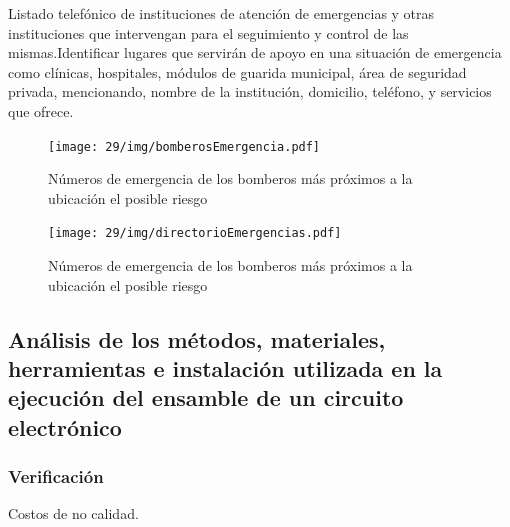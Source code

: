     Listado telefónico de instituciones de atención de emergencias y otras instituciones que intervengan para el seguimiento y control de las mismas.Identificar  lugares que servirán de apoyo en una situación de emergencia como clínicas, hospitales, módulos de guarida municipal, área de seguridad privada, mencionando, nombre de la institución, domicilio, teléfono, y servicios que ofrece. 
    
    \begin{figure}[H]
        \centering
        \texttt{[image: 29/img/bomberosEmergencia.pdf]}
        \caption{Números de emergencia de los bomberos más próximos a la ubicación el posible riesgo}
    \end{figure}
    \begin{figure}[H]
        \centering
        \texttt{[image: 29/img/directorioEmergencias.pdf]}
        \caption{Números de emergencia de los bomberos más próximos a la ubicación el posible riesgo}
    \end{figure}
    \subsection{Análisis de los métodos, materiales, herramientas e instalación utilizada en la ejecución del ensamble de un circuito electrónico}
    
    \subsubsection{Verificación}
    
    Costos de no calidad.

